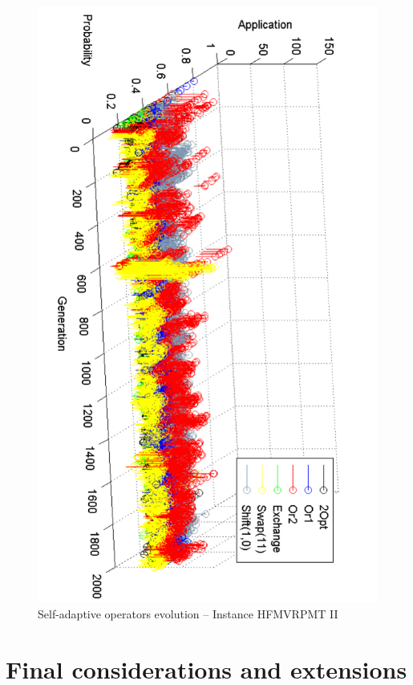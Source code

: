 \documentclass{endm}
\begin{document}
\begin{figure}[htbp]
	\center
 	\includegraphics[angle=90,width=\textwidth]{./figs/HFVRP/VRPOr2Improvements.pdf}
	\caption{Self-adaptive operators evolution -- Instance HFMVRPMT II} 
	\label{fig:VRPOr2Improvements}
\end{figure}


\section{Final considerations and extensions\label{sec:discussion}}
\end{document}
